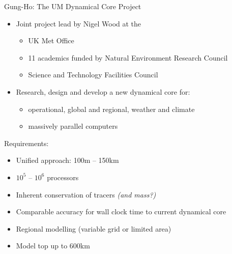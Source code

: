  
\makeatletter{}\begin{frame}
\begin{block}{Gung-Ho: The UM Dynamical Core Project}

\begin{itemize}
\pause
\item Joint project lead by Nigel Wood at the
    \begin{itemize}
    \item UK Met Office
    \item 11 academics funded by Natural Environment Research Council
    \item Science and Technology Facilities Council
    \end{itemize}
\pause
\item Research, design and develop a new dynamical core for:
    \begin{itemize}
    \item operational, global and regional, weather and climate
    \item massively parallel computers
    \end{itemize}
\end{itemize}
\end{block}
\pause
\begin{block}{Requirements:}
\pause
\begin{itemize}
\item Unified approach: 100m -- 150km
\item $10^5$ -- $10^6$ processors
\item Inherent conservation of tracers {\color{purple}\it (and mass?)}
\item Comparable accuracy for wall clock time to current dynamical core
\item Regional modelling (variable grid or limited area)
\item Model top up to 600km
\end{itemize}
\end{block}

\end{frame}


